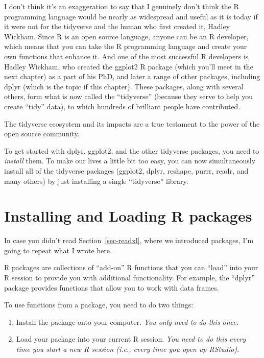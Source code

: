 \documentclass[
  letterpaper,
  DIV=11,
  numbers=noendperiod]{scrreprt}
\begin{document}
I don't think it's an exaggeration to say that I genuinely don't think
the R programming language would be nearly as widespread and useful as
it is today if it were not for the tidyverse and the human who first
created it, Hadley Wickham. Since R is an open source language, anyone
can be an R developer, which means that you can take the R programming
language and create your own functions that enhance it. And one of the
most successful R developers is Hadley Wickham, who created the ggplot2
R package (which you'll meet in the next chapter) as a part of his PhD,
and later a range of other packages, including dplyr (which is the topic
if this chapter). These packages, along with several others, form what
is now called the ``tidyverse'' (because they serve to help you create
``tidy'' data), to which hundreds of brilliant people have contributed.

The tidyverse ecosystem and its impacts are a true testament to the
power of the open source community.

To get started with dplyr, ggplot2, and the other tidyverse packages,
you need to \emph{install} them. To make our lives a little bit too
easy, you can now simultaneously install all of the tidyverse packages
(ggplot2, dplyr, reshape, purrr, readr, and many others) by just
installing a single ``tidyverse'' library.

\section{Installing and Loading R
packages}\label{installing-and-loading-r-packages}

In case you didn't read Section~\ref{sec-readxl}, where we introduced
packages, I'm going to repeat what I wrote here.

R packages are collections of ``add-on'' R functions that you can
``load'' into your R session to provide you with additional
functionality. For example, the ``dplyr'' package provides functions
that allow you to work with data frames.

To use functions from a package, you need to do two things:

\begin{enumerate}
\def\labelenumi{\arabic{enumi}.}
\item
  Install the package onto your computer. \emph{You only need to do this
  once.}
\item
  Load your package into your current R session. \emph{You need to do
  this every time you start a new R session (i.e., every time you open
  up RStudio).}
\end{enumerate}
\end{document}
